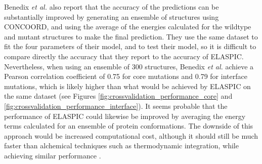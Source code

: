 Benedix \textit{et al.} \cite{benedix_predicting_2009} also report that the accuracy of the predictions can be substantially improved by generating an ensemble of structures using CONCOORD, and using the average of the energies calculated for the wildtype and mutant structures to make the final prediction. They use the same dataset to fit the four parameters of their model, and to test their model, so it is difficult to compare directly the accuracy that they report to the accuracy of ELASPIC. Nevertheless, when using an ensemble of 300 structures, Benedix \textit{et al.} achieve a Pearson correlation coefficient of 0.75 for core mutations and 0.79 for interface mutations, which is likely higher than what would be achieved by ELASPIC on the same dataset (see Figures \ref{fig:crossvalidation_performance_core} and \ref{fig:crossvalidation_performance_interface}). It seems probable that the performance of ELASPIC could likewise be improved by averaging the energy terms calculated for an ensemble of protein conformations. The downside of this approach would be increased computational cost, although it should still be much faster than alchemical techniques such as thermodynamic integration, while achieving similar performance \cite{seeliger_protein_2010}.

